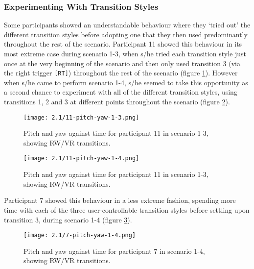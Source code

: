 
\subsubsection{Experimenting With Transition Styles}

Some participants showed an understandable behaviour where they `tried out' the different transition styles before adopting one that they then used predominantly throughout the rest of the scenario. Participant 11 showed this behaviour in its most extreme case during scenario 1-3, when s/he tried each transition style just once at the very beginning of the scenario and then only used transition 3 (via the right trigger \texttt{[RT]}) throughout the rest of the scenario (figure \ref{11-pitch-yaw-1-3.png}). However when s/he came to perform scenario 1-4, s/he seemed to take this opportunity as a second chance to experiment with all of the different transition styles, using transitions 1, 2 and 3 at different points throughout the scenario (figure \ref{11-pitch-yaw-1-4.png}).

\begin{figure}[h]
	\begin{center}
	\texttt{[image: 2.1/11-pitch-yaw-1-3.png]}
	\caption{Pitch and yaw against time for participant 11 in scenario 1-3, showing RW/VR transitions.}
	\label{11-pitch-yaw-1-3.png}
	\end{center}
\end{figure}

\begin{figure}[h]
	\begin{center}
	\texttt{[image: 2.1/11-pitch-yaw-1-4.png]}
	\caption{Pitch and yaw against time for participant 11 in scenario 1-3, showing RW/VR transitions.}
	\label{11-pitch-yaw-1-4.png}
	\end{center}
\end{figure}

Participant 7 showed this behaviour in a less extreme fashion, spending more time with each of the three user-controllable transition styles before settling upon transition 3, during scenario 1-4 (figure \ref{7-pitch-yaw-1-4.png}).

\begin{figure}[h]
	\begin{center}
	\texttt{[image: 2.1/7-pitch-yaw-1-4.png]}
	\caption{Pitch and yaw against time for participant 7 in scenario 1-4, showing RW/VR transitions.}
	\label{7-pitch-yaw-1-4.png}
	\end{center}
\end{figure}

